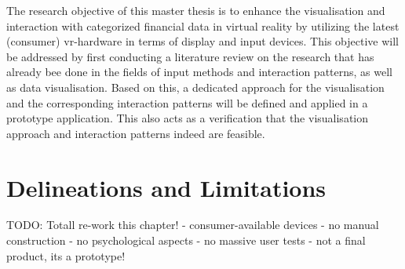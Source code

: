The research objective of this master thesis is to enhance the visualisation and interaction with categorized financial data in virtual reality by utilizing the latest (consumer) \gls{vr}-hardware in terms of display and input devices. \newline
This objective will be addressed by first conducting a literature review on the research that has already bee done in the fields of input methods and interaction patterns, as well as data visualisation. Based on this, a dedicated approach for the visualisation and the corresponding interaction patterns will be defined and applied in a prototype application. This also acts as a verification that the visualisation approach and interaction patterns indeed are feasible.






\section{Delineations and Limitations}

TODO: Totall re-work this chapter!
- consumer-available devices
- no manual construction
- no psychological aspects
- no massive user tests
- not a final product, its a prototype!


